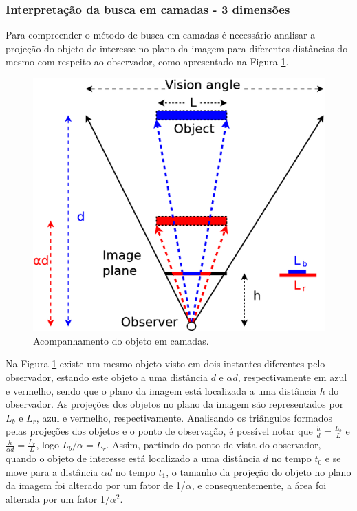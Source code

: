 

\subsubsection{Interpretação da busca em camadas - 3 dimensões}

Para compreender o método de busca em camadas é necessário analisar a projeção do objeto de interesse
no plano da imagem para diferentes distâncias do mesmo com respeito ao observador, 
como apresentado na Figura \ref{fig:multiscale3d}.
\begin{figure}[H]
\centering
  \includegraphics[width=.7\columnwidth]{images/Diagrama3.eps}
  \caption{ Acompanhamento do objeto em camadas.}
  \label{fig:multiscale3d}
\end{figure}
Na Figura \ref{fig:multiscale3d} existe um mesmo objeto visto em dois instantes diferentes pelo observador,
estando este objeto a uma distância $d$ e $\alpha d$, respectivamente em azul e vermelho, sendo que
o plano da imagem está localizada a uma distância $h$ do observador. As projeções dos objetos no plano da imagem
 são representados por $L_b$ e $L_r$, azul e vermelho, respectivamente. 
 Analisando os triângulos formados pelas projeções dos objetos e o ponto de observação, 
 é possível notar que $\frac{h}{d}=\frac{L_b}{L}$ e $\frac{h}{\alpha d}=\frac{L_r}{L}$, logo 
$L_b/\alpha= L_r$. 
Assim, partindo do ponto de vista do observador, quando o objeto de interesse está localizado a uma distância $d$ no tempo
$t_0$ e se move para a distância $\alpha d$ no tempo $t_1$, o tamanho da projeção do objeto no plano da imagem 
foi alterado por um fator de 1/$\alpha$, e consequentemente, a área foi alterada por um fator 1/$\alpha^2$.

